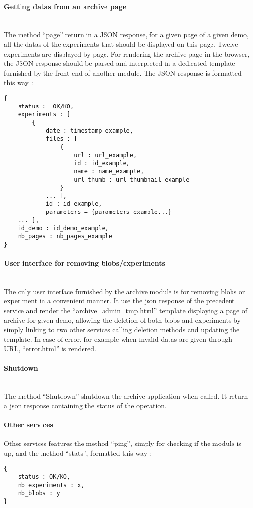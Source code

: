 \paragraph{Getting datas from an archive page} \hspace{0pt} \\
The method ``page'' return in a JSON response, for a given page of a given demo, all the datas of the experiments that should be displayed on this page. Twelve experiments are displayed by page. For rendering the archive page in the browser, the JSON response should be parsed and interpreted in a dedicated template furnished by the front-end of another module. The JSON response is formatted this way : 
\begin{verbatim}
{
    status :  OK/KO,
    experiments : [
        {
            date : timestamp_example, 
            files : [
                {
                    url : url_example,
                    id : id_example,
                    name : name_example,
                    url_thumb : url_thumbnail_example
                }
            ... ],
            id : id_example,
            parameters = {parameters_example...}
    ... ],
    id_demo : id_demo_example,
    nb_pages : nb_pages_example
}
\end{verbatim} 

\paragraph{User interface for removing blobs/experiments} \hspace{0pt} \\
The only user interface furnished by the archive module is for removing blobs or experiment in a convenient manner. It use the json response of the precedent service and render the ``archive\_admin\_tmp.html'' template displaying a page of archive for given demo, allowing the deletion of both blobs and experiments by simply linking to two other services calling deletion methods and updating the template. In case of error, for example when invalid datas are given through URL, ``error.html'' is rendered.

\paragraph{Shutdown} \hspace{0pt} \\
The method ``Shutdown'' shutdown the archive application when called. It return a json response containing the status of the operation.

\paragraph{Other services}
Other services features the method ``ping'', simply for checking if the module is up, and the method ``stats'', formatted this way :
\begin{verbatim}
{
    status : OK/KO,
    nb_experiments : x,
    nb_blobs : y
}
\end{verbatim}

